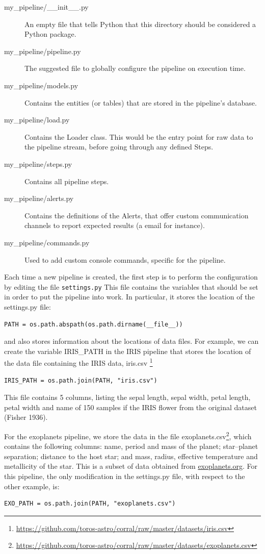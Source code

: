 \documentclass[final,5p,times,twocolumn,authoryear]{elsarticle}
\begin{document}
\begin{description}
   \item [my\_pipeline/\_\_init\_\_.py] An empty file that tells
      Python that this directory should be considered a Python
      package.
   \item [my\_pipeline/pipeline.py] The suggested file to globally
      configure the pipeline on execution time.
   \item [my\_pipeline/models.py] Contains the entities (or tables)
      that are stored in the pipeline’s database.
   \item [my\_pipeline/load.py] Contains the Loader class. This would
      be the entry point for raw data to the pipeline stream, before
      going through any defined Steps.
   \item [my\_pipeline/steps.py] Contains all pipeline steps.
   \item [my\_pipeline/alerts.py] Contains the definitions of the
      Alerts, that offer custom communication channels to report
      expected results (a email for instance).
   \item [my\_pipeline/commands.py] Used to add custom console commands, specific for the pipeline.
\end{description}

Each time a new pipeline is created, the first step is to perform the
configuration by editing the file \texttt{settings.py}
%
This file contains the variables that should be set in order to put
the pipeline into work.
%
In particular, it stores the location of the settings.py file:
\begin{verbatim}
PATH = os.path.abspath(os.path.dirname(__file__))
\end{verbatim}
%
and also stores information about the locations of data files.
%
For example, we can create the variable IRIS\_PATH in the IRIS
pipeline that stores the
location of the data file containing the IRIS data, iris.csv
\footnote{\url{https://github.com/toros-astro/corral/raw/master/datasets/iris.csv}}
%
\begin{verbatim}
IRIS_PATH = os.path.join(PATH, "iris.csv")
\end{verbatim}
%
This file contains 5 columns, listing the sepal length, sepal width,
petal length, petal width and name of 150 samples if the IRIS flower
from the original dataset (Fisher 1936).

For the exoplanets pipeline, we store the data in the file
exoplanets.csv\footnote{\url{https://github.com/toros-astro/corral/raw/master/datasets/exoplanets.csv}},
which contains the following columns: name, period and mass of the
planet; star--planet separation; distance to the host star; and mass,
radius, effective temperature and metallicity of the star.
%
This is a subset of data obtained from \url{exoplanets.org}.
%
For this pipeline, the only modification in the settings.py file, with
respect to the other example, is:
%
\begin{verbatim}
EXO_PATH = os.path.join(PATH, "exoplanets.csv")
\end{verbatim}
\end{document}
